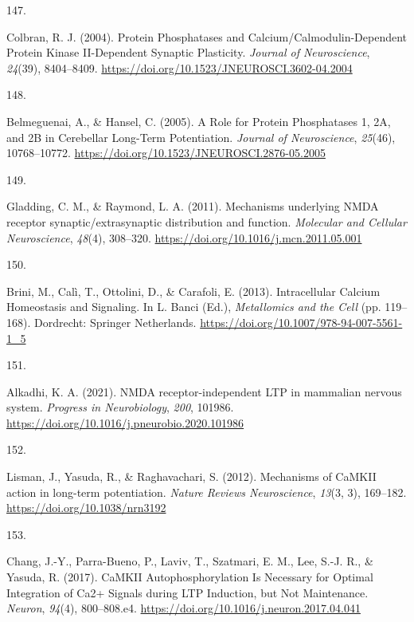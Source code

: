 \documentclass[
  11pt,
  letterpaper,
]{scrreprt}
\newlength{\cslhangindent}
\newlength{\csllabelwidth}
\newenvironment{CSLReferences}[2] %
 {\begin{list}{}{%
  \setlength{\itemindent}{0pt}
  \setlength{\leftmargin}{0pt}
  \setlength{\parsep}{0pt}
  \ifodd #1
   \setlength{\leftmargin}{\cslhangindent}
   \setlength{\itemindent}{-1\cslhangindent}
  \fi
  \setlength{\itemsep}{#2\baselineskip}}}
 {\end{list}}
\newcommand{\CSLLeftMargin}[1]{\parbox[t]{\csllabelwidth}{\strut#1\strut}}
\newcommand{\CSLRightInline}[1]{\parbox[t]{\linewidth - \csllabelwidth}{\strut#1\strut}}
\begin{document}
\begin{CSLReferences}{0}{0}
\CSLLeftMargin{147. }%
\CSLRightInline{Colbran, R. J. (2004). Protein {Phosphatases} and
{Calcium}/{Calmodulin-Dependent Protein Kinase II-Dependent Synaptic
Plasticity}. \emph{Journal of Neuroscience}, \emph{24}(39), 8404--8409.
\url{https://doi.org/10.1523/JNEUROSCI.3602-04.2004}}

\CSLLeftMargin{148. }%
\CSLRightInline{Belmeguenai, A., \& Hansel, C. (2005). A {Role} for
{Protein Phosphatases} 1, {2A}, and {2B} in {Cerebellar Long-Term
Potentiation}. \emph{Journal of Neuroscience}, \emph{25}(46),
10768--10772. \url{https://doi.org/10.1523/JNEUROSCI.2876-05.2005}}

\CSLLeftMargin{149. }%
\CSLRightInline{Gladding, C. M., \& Raymond, L. A. (2011). Mechanisms
underlying {NMDA} receptor synaptic/extrasynaptic distribution and
function. \emph{Molecular and Cellular Neuroscience}, \emph{48}(4),
308--320. \url{https://doi.org/10.1016/j.mcn.2011.05.001}}

\CSLLeftMargin{150. }%
\CSLRightInline{Brini, M., Calì, T., Ottolini, D., \& Carafoli, E.
(2013). Intracellular {Calcium Homeostasis} and {Signaling}. In L. Banci
(Ed.), \emph{Metallomics and the {Cell}} (pp. 119--168). Dordrecht:
Springer Netherlands. \url{https://doi.org/10.1007/978-94-007-5561-1_5}}

\CSLLeftMargin{151. }%
\CSLRightInline{Alkadhi, K. A. (2021). {NMDA} receptor-independent {LTP}
in mammalian nervous system. \emph{Progress in Neurobiology},
\emph{200}, 101986.
\url{https://doi.org/10.1016/j.pneurobio.2020.101986}}

\CSLLeftMargin{152. }%
\CSLRightInline{Lisman, J., Yasuda, R., \& Raghavachari, S. (2012).
Mechanisms of {CaMKII} action in long-term potentiation. \emph{Nature
Reviews Neuroscience}, \emph{13}(3, 3), 169--182.
\url{https://doi.org/10.1038/nrn3192}}

\CSLLeftMargin{153. }%
\CSLRightInline{Chang, J.-Y., Parra-Bueno, P., Laviv, T., Szatmari, E.
M., Lee, S.-J. R., \& Yasuda, R. (2017). {CaMKII Autophosphorylation Is
Necessary} for {Optimal Integration} of {Ca2}+ {Signals} during {LTP
Induction}, but {Not Maintenance}. \emph{Neuron}, \emph{94}(4),
800--808.e4. \url{https://doi.org/10.1016/j.neuron.2017.04.041}}


\end{CSLReferences}
\end{document}
